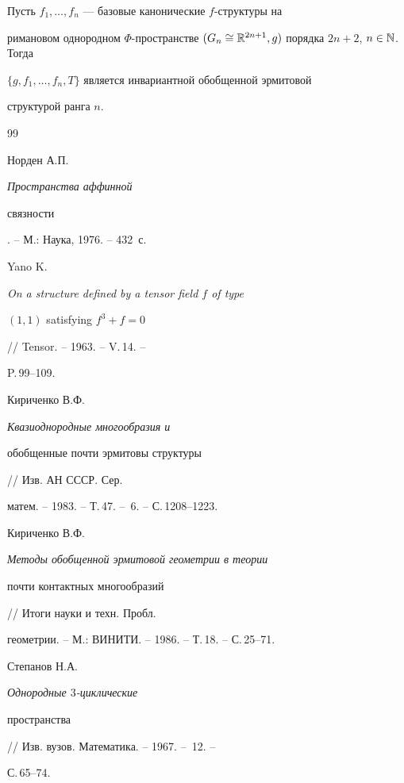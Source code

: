 \begin{thm}\label{t6}


Пусть $f_1,\dotsc,f_n$ --- базовые канонические $f$-структуры на


римановом однородном $\Phi$-пространстве $(G_n\cong


\Bbb{R}^{2n+1},g)$ порядка $2n+2$, $n\in\Bbb{N}$. Тогда


$\{g,f_1,\dotsc,f_n,T\}$ является инвариантной обобщенной эрмитовой


структурой ранга $n$.


\end{thm}








\begin{thebibliography}{99}


 Норден А.П. {\it Пространства аффинной 


связности}. -- М.: Наука, 1976. -- 432~с.





 Yano K. {\it On a structure defined by a tensor field $f$ of type


$(1,1)$ satisfying $f^3+f=0$} // Tensor. -- 1963. -- V.\,14. --


P.\,99--109.





 Кириченко В.Ф. {\it Квазиоднородные многообразия и


обобщенные почти эрмитовы структуры} // Изв. АН СССР. Сер.


матем. -- 1983. -- Т.\,47. -- \No\,6. -- С.\,1208--1223.





 Кириченко В.Ф. {\it Методы обобщенной эрмитовой геометрии в теории


почти контактных многообразий} // Итоги науки и техн. Пробл.


геометрии. -- М.: ВИНИТИ. -- 1986. -- Т.\,18. -- С.\,25--71.





 Степанов Н.А. {\it Однородные $3$-циклические


пространства} // Изв. вузов. Математика. -- 1967. -- \No\,12. --


С.\,65--74.






\end{thebibliography}
